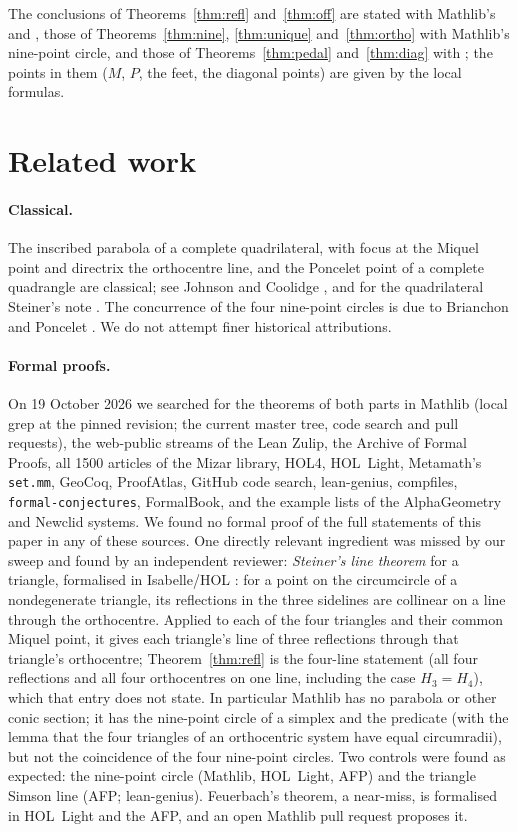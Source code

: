 \documentclass[11pt]{article}
\theoremstyle{definition}
\theoremstyle{remark}
\begin{document}
The conclusions of Theorems~\ref{thm:refl} and~\ref{thm:off} are stated with Mathlib's
 and , those of Theorems~\ref{thm:nine}, \ref{thm:unique}
and~\ref{thm:ortho} with Mathlib's nine-point circle, and those of Theorems~\ref{thm:pedal}
and~\ref{thm:diag} with ; the points in them ($M$, $P$, the feet,
the diagonal points) are given by the local formulas.

\section{Related work}\label{sec:related}
\paragraph{Classical.} The inscribed parabola of a complete quadrilateral, with focus at the Miquel
point and directrix the orthocentre line, and the Poncelet point of a complete quadrangle are classical;
see Johnson \cite{johnson1929} and Coolidge \cite{coolidge1916}, and for the quadrilateral Steiner's
note \cite{steiner1828}. The concurrence of the four nine-point circles is due to Brianchon and Poncelet
\cite{brianchonponcelet}. We do not attempt finer historical attributions.

\paragraph{Formal proofs.} On 19 October 2026 we searched for the theorems of both parts in Mathlib
(local grep at the pinned revision; the current master tree, code search and pull requests), the
web-public streams of the Lean Zulip, the Archive of Formal Proofs, all 1500 articles of the Mizar
library, HOL4, HOL~Light, Metamath's \texttt{set.mm}, GeoCoq, ProofAtlas, GitHub code search,
lean-genius, compfiles, \texttt{formal-conjectures}, FormalBook, and the example lists of the
AlphaGeometry and Newclid systems. We found no formal proof of the full statements of this paper in any of these sources.
One directly relevant ingredient was missed by our sweep and found by an independent reviewer:
\emph{Steiner's line theorem} for a triangle, formalised in Isabelle/HOL \cite{afpsteinerline}: for a
point on the circumcircle of a nondegenerate triangle, its reflections in the three sidelines are
collinear on a line through the orthocentre. Applied to each of the four triangles and their common
Miquel point, it gives each triangle's line of three reflections through that triangle's orthocentre;
Theorem~\ref{thm:refl} is the four-line statement (all four reflections and all four orthocentres on
one line, including the case $H_3=H_4$), which that entry does not state. In particular Mathlib has no parabola or other conic
section; it has the nine-point circle of a simplex and the predicate
 (with the lemma that the four triangles of an orthocentric system have
equal circumradii), but not the coincidence of the four nine-point circles. Two controls were found as
expected: the nine-point circle (Mathlib, HOL~Light, AFP) and the triangle Simson line (AFP; lean-genius).
Feuerbach's theorem, a near-miss, is formalised in HOL~Light and the AFP, and an open Mathlib pull
request proposes it.
\end{document}
